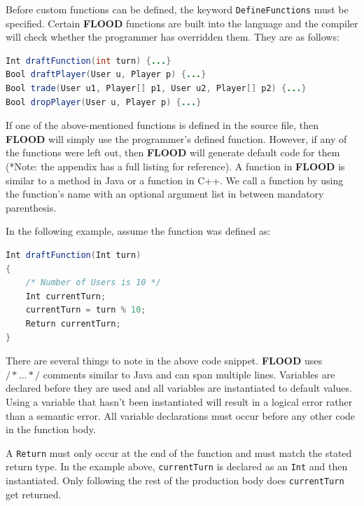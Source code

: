 \documentclass[12pt]{report}
\begin{document}
Before custom functions can be defined, the keyword \texttt{DefineFunctions} must be specified. Certain \textbf{FLOOD} functions are built into the language and the compiler will check whether the programmer has overridden them. They are as follows:

\begin{singlespace}
\begin{lstlisting}[language=Java,label=some-code,caption=Predefined FLOOD functions]
Int draftFunction(int turn) {...}
Bool draftPlayer(User u, Player p) {...}
Bool trade(User u1, Player[] p1, User u2, Player[] p2) {...}
Bool dropPlayer(User u, Player p) {...}
\end{lstlisting}
\end{singlespace}

If one of the above-mentioned functions is defined in the source file, then \textbf{FLOOD} will simply use the programmer's defined function. However, if any of the functions were left out, then \textbf{FLOOD} will generate default code for them (*Note: the appendix has a full listing for reference). A function in \textbf{FLOOD} is similar to a method in Java or a function in C++. We call a function by using the function's name with an optional argument list in between mandatory parenthesis.

In the following example, assume the function was defined as:

\begin{singlespace}
\begin{lstlisting}[language=Java,label=some-code,caption=Predefined FLOOD functions]
Int draftFunction(Int turn)
{
	/* Number of Users is 10 */
	Int currentTurn;
	currentTurn = turn % 10;
	Return currentTurn;
}
\end{lstlisting}
\end{singlespace}

There are several things to note in the above code snippet. \textbf{FLOOD} uses $/*\ldots*/$ comments similar to Java and can span multiple lines. Variables are declared before they are used and all variables are instantiated to default values. Using a variable that hasn't been instantiated will result in a logical error rather than a semantic error. All variable declarations must occur before any other code in the function body. 

A \texttt{Return} must only occur at the end of the function and must match the stated return type. In the example above, \texttt{currentTurn} is declared as an \texttt{Int} and then instantiated. Only following the rest of the production body does \texttt{currentTurn} get returned.
\end{document}

